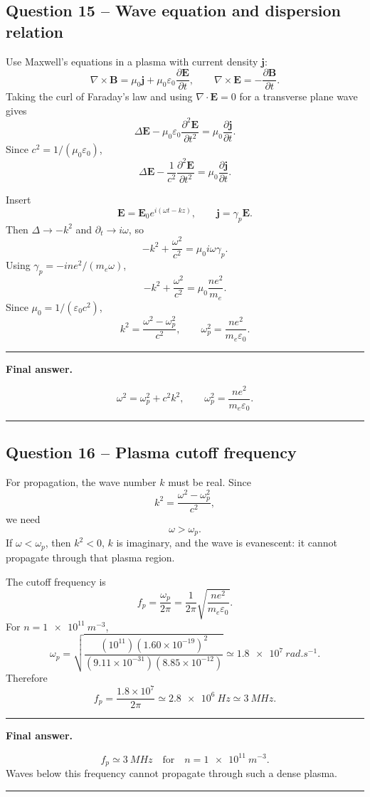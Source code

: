 \documentclass[11pt,a4paper]{article}
\newenvironment{finalanswer}{%
  \begin{center}\begin{minipage}{0.94\linewidth}\hrule\vspace{0.45em}\textbf{Final answer. }%
}{%
  \vspace{0.45em}\hrule\end{minipage}\end{center}%
}
\newcommand{\E}{\mathbf{E}}
\newcommand{\B}{\mathbf{B}}
\newcommand{\jv}{\mathbf{j}}
\begin{document}
\subsection*{Question 15 -- Wave equation and dispersion relation}

Use Maxwell's equations in a plasma with current density $\jv$:
\[
 \nabla\times\B=\mu_0\jv+\mu_0\varepsilon_0\frac{\partial\E}{\partial t},
 \qquad
 \nabla\times\E=-\frac{\partial\B}{\partial t}.
\]
Taking the curl of Faraday's law and using $\nabla\cdot\E=0$ for a transverse plane wave gives
\[
 \Delta\E-\mu_0\varepsilon_0\frac{\partial^2\E}{\partial t^2}
 =\mu_0\frac{\partial\jv}{\partial t}.
\]
Since $c^2=1/(\mu_0\varepsilon_0)$,
\[
 \Delta\E-\frac{1}{c^2}\frac{\partial^2\E}{\partial t^2}
 =\mu_0\frac{\partial\jv}{\partial t}.
\]

Insert
\[
 \E=\E_0e^{i(\omega t-kz)},\qquad \jv=\gamma_p\E.
\]
Then $\Delta\to -k^2$ and $\partial_t\to i\omega$, so
\[
 -k^2+\frac{\omega^2}{c^2}=\mu_0 i\omega\gamma_p.
\]
Using $\gamma_p=-i n e^2/(m_e\omega)$,
\[
 -k^2+\frac{\omega^2}{c^2}=\mu_0\frac{n e^2}{m_e}.
\]
Since $\mu_0=1/(\varepsilon_0c^2)$,
\[
 k^2=\frac{\omega^2-\omega_p^2}{c^2},
 \qquad
 \omega_p^2=\frac{n e^2}{m_e\varepsilon_0}.
\]

\begin{finalanswer}
\[
\omega^2=\omega_p^2+c^2k^2,
\qquad
\omega_p^2=\frac{n e^2}{m_e\varepsilon_0}.
\]
\end{finalanswer}

\subsection*{Question 16 -- Plasma cutoff frequency}

For propagation, the wave number $k$ must be real. Since
\[
 k^2=\frac{\omega^2-\omega_p^2}{c^2},
\]
we need
\[
 \omega>\omega_p.
\]
If $\omega<\omega_p$, then $k^2<0$, $k$ is imaginary, and the wave is evanescent: it cannot propagate through that plasma region.

The cutoff frequency is
\[
 f_p=\frac{\omega_p}{2\pi}
 =\frac{1}{2\pi}\sqrt{\frac{n e^2}{m_e\varepsilon_0}}.
\]
For $n=\SI{1e11}{m^{-3}}$,
\[
 \omega_p=\sqrt{\frac{(10^{11})(1.60\times10^{-19})^2}{(9.11\times10^{-31})(8.85\times10^{-12})}}
 \simeq\SI{1.8e7}{rad.s^{-1}}.
\]
Therefore
\[
 f_p=\frac{1.8\times10^7}{2\pi}\simeq\SI{2.8e6}{Hz}\simeq\SI{3}{MHz}.
\]

\begin{finalanswer}
\[
f_p\simeq\SI{3}{MHz}\quad\text{for}\quad n=\SI{1e11}{m^{-3}}.
\]
Waves below this frequency cannot propagate through such a dense plasma.
\end{finalanswer}
\end{document}
